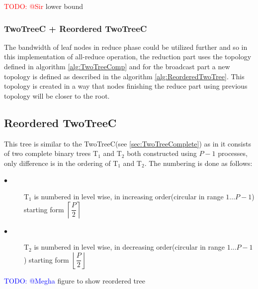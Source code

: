 \documentclass[sigplan,review,anonymous]{acmart}\settopmatter{printfolios=true,printccs=false,printacmref=false}
\begin{document}
\textcolor{red}{TODO: @Sir} lower bound 

\subsubsection{TwoTreeC + Reordered TwoTreeC}
The bandwidth of leaf nodes in reduce phase could be utilized further and so in this implementation of all-reduce operation, the reduction part uses the topology defined in algorithm \ref{alg:TwoTreeComp} and for the broadcast part a new topology is defined as described in the algorithm \ref{alg:ReorderedTwoTree}. This topology is created in a way that nodes finishing the reduce part using previous topology will be closer to the root.\\

\subsection{Reordered TwoTreeC}
This tree is similar to the TwoTreeC(see \ref{sec:TwoTreeComplete}) as in it consists of two complete binary trees T$_{1}$ and T$_{2}$ both constructed using $P-1$ processes, only difference is in the ordering of T$_{1}$ and T$_{2}$. The numbering is done as follows:
 \begin{description}
     \item[$\bullet$]T$_{1}$ is numbered in level wise, in increasing order(circular in range $1...P-1$) starting form $\left \lceil{\dfrac{P}{2}}\right \rceil$
     \item[$\bullet$] T$_{2}$ is numbered in level wise, in decreasing order(circular in range $1...P-1$) starting form $\left \lfloor{\dfrac{P}{2}}\right\rfloor $
 \end{description}

\textcolor{blue}{TODO: @Megha} figure to show reordered tree
\end{document}
